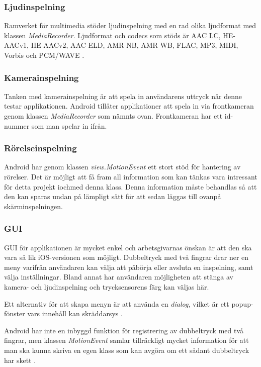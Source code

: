 \subsubsection{Ljudinspelning}
\label{subsubsec:ljudinspelning}
Ramverket för multimedia stöder ljudinspelning med en rad olika ljudformat med klassen \textit{MediaRecorder}. Ljudformat och codecs som stöds är AAC LC, HE-AACv1, HE-AACv2, AAC ELD, AMR-NB, AMR-WB, FLAC, MP3, MIDI, Vorbis och PCM/WAVE \parencite{sound}.

\subsubsection{Kamerainspelning}
\label{subsubsec:kamerainspelning}
Tanken med kamerainspelning är att spela in användarens uttryck när denne testar applikationen. Android tillåter applikationer att spela in via frontkameran genom klassen \textit{MediaRecorder} \parencite{frontcamera} som nämnts ovan. Frontkameran har ett id-nummer som man spelar in ifrån.

\subsubsection{Rörelseinspelning}
\label{subsubsec:movement}
Android har genom klassen \emph{view.MotionEvent}\parencite{motionevent} ett stort stöd för hantering av rörelser. Det är möjligt att få fram all information som kan tänkas vara intressant för detta projekt iochmed denna klass. Denna information måste behandlas så att den kan sparas undan på lämpligt sätt för att sedan läggas till ovanpå skärminspelningen.

\subsubsection{GUI}
\label{subsubsec:gui}
GUI för applikationen är mycket enkel och arbetsgivarnas önskan är att den ska vara så lik iOS-versionen som möjligt. Dubbeltryck med två fingrar drar ner en meny varifrån användaren kan välja att påbörja eller avsluta en inspelning, samt välja inställningar. Bland annat har användaren möjligheten att stänga av kamera- och ljudinspelning och trycksensorens färg kan väljas här. 

Ett alternativ för att skapa menyn är att använda en \textit{dialog}, vilket är ett popup-fönster vars innehåll kan skräddarsys \parencite{dialog}. 

Android har inte en inbyggd funktion för registrering av dubbeltryck med två fingrar, men klassen \textit{MotionEvent} samlar tillräckligt mycket information för att man ska kunna skriva en egen klass som kan avgöra om ett sådant dubbeltryck har skett \parencite{dbletap}.

